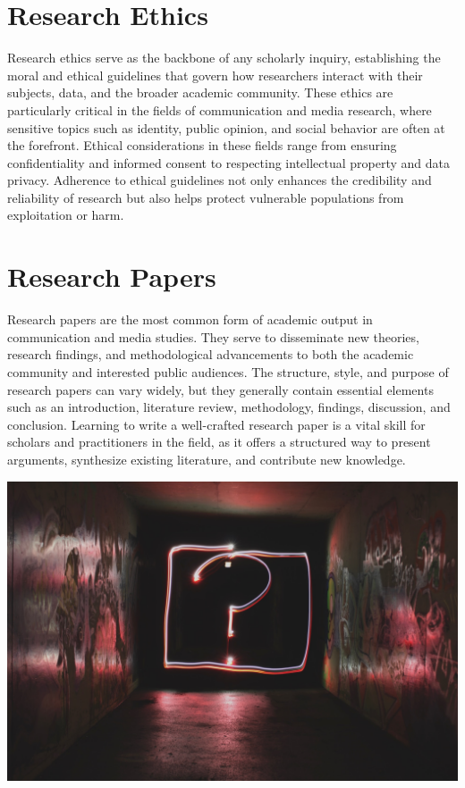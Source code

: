 \documentclass[
  b5paper]{book}
\begin{document}
\hypertarget{research-ethics}{%
\section*{Research Ethics}\label{research-ethics}}

Research ethics serve as the backbone of any scholarly inquiry, establishing the moral and ethical guidelines that govern how researchers interact with their subjects, data, and the broader academic community. These ethics are particularly critical in the fields of communication and media research, where sensitive topics such as identity, public opinion, and social behavior are often at the forefront. Ethical considerations in these fields range from ensuring confidentiality and informed consent to respecting intellectual property and data privacy. Adherence to ethical guidelines not only enhances the credibility and reliability of research but also helps protect vulnerable populations from exploitation or harm.

\hypertarget{research-papers}{%
\section*{Research Papers}\label{research-papers}}

Research papers are the most common form of academic output in communication and media studies. They serve to disseminate new theories, research findings, and methodological advancements to both the academic community and interested public audiences. The structure, style, and purpose of research papers can vary widely, but they generally contain essential elements such as an introduction, literature review, methodology, findings, discussion, and conclusion. Learning to write a well-crafted research paper is a vital skill for scholars and practitioners in the field, as it offers a structured way to present arguments, synthesize existing literature, and contribute new knowledge.

\includegraphics[width=1\textwidth,height=\textheight]{images/question_mark.jpg}
\end{document}
